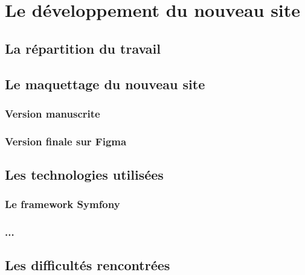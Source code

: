 \chapter{Le développement du nouveau site}

\section{La répartition du travail}
\section{Le maquettage du nouveau site}
\subsection{Version manuscrite}
\subsection{Version finale sur Figma}
\section{Les technologies utilisées}
\subsection{Le framework Symfony}
\subsection{...}
\section{Les difficultés rencontrées}

